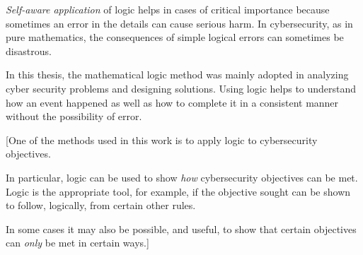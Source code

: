 {\em Self-aware application} of logic helps in cases of critical importance because sometimes an error in the details can cause serious harm. In cybersecurity, as in pure mathematics, the consequences of simple logical errors can sometimes be disastrous.

In this thesis, the mathematical logic method was mainly adopted in analyzing cyber security problems and designing solutions. Using logic helps to understand how an event happened as well as how to complete it in a consistent manner without the possibility of error.
\iffalse
This extra step of {\em self-aware application} of logic is not always necessary but helps in cases of critical importance, where getting details wrong can sometimes cause serious harm. In cybersecurity, as in pure mathematics, the consequences of minor logical mistakes can sometimes be disastrous. 

This is why, in this dessertation, {\em mathematical} logic is regarded as the key scientific method which we employ to analyse cybersecurity problems, and in the design of cybersecurity solutions.
\if
This is not meant to suggest that mathematical logic should be used on a regular basis by cybersecurity professionals. Many cybersecurity professionals will never use it, and currently, many may not even have heard ot it. However, {\em logic} is used by all cybersecurity professionals on a regular basis. In the course of understanding how this takes place, and how it is done consistently and correctly, with as little chance of error as possible, we need to develop the sort of self-awareness, of what we are doing, that is best characerised, and explained, in the particular form of logic known as mathematical logic.\index{logic!mathematical}
\fi
[One of the methods used in this work is to apply logic to cybersecurity objectives. 

In particular, logic can be used to show {\em how} cybersecurity objectives can
be met. Logic is the appropriate tool, for example, if the objective sought can
be shown to follow, logically, from certain other rules.

In some cases it may also be possible, and useful, to show that certain objectives can {\em only}
be met in certain ways.]

\fi



